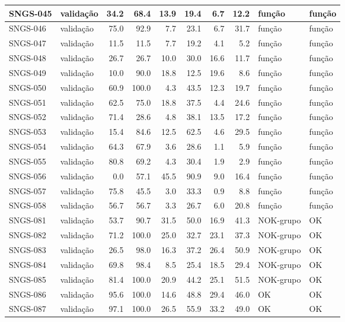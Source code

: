 \begin{small}
\begin{longtable}{|l|l|r|r|r|r|r|r|l|l|}
SNGS-045 & validação & 34.2 & 68.4 & 13.9 & 19.4 & 6.7 & 12.2 & função & função \\ \hline
SNGS-046 & validação & 75.0 & 92.9 & 7.7 & 23.1 & 6.7 & 31.7 & função & função \\ \hline
SNGS-047 & validação & 11.5 & 11.5 & 7.7 & 19.2 & 4.1 & 5.2 & função & função \\ \hline
SNGS-048 & validação & 26.7 & 26.7 & 10.0 & 30.0 & 16.6 & 11.7 & função & função \\ \hline
SNGS-049 & validação & 10.0 & 90.0 & 18.8 & 12.5 & 19.6 & 8.6 & função & função \\ \hline
SNGS-050 & validação & 60.9 & 100.0 & 4.3 & 43.5 & 12.3 & 19.7 & função & função \\ \hline
SNGS-051 & validação & 62.5 & 75.0 & 18.8 & 37.5 & 4.4 & 24.6 & função & função \\ \hline
SNGS-052 & validação & 71.4 & 28.6 & 4.8 & 38.1 & 13.5 & 17.2 & função & função \\ \hline
SNGS-053 & validação & 15.4 & 84.6 & 12.5 & 62.5 & 4.6 & 29.5 & função & função \\ \hline
SNGS-054 & validação & 64.3 & 67.9 & 3.6 & 28.6 & 1.1 & 5.9 & função & função \\ \hline
SNGS-055 & validação & 80.8 & 69.2 & 4.3 & 30.4 & 1.9 & 2.9 & função & função \\ \hline
SNGS-056 & validação & 0.0 & 57.1 & 45.5 & 90.9 & 9.0 & 16.4 & função & função \\ \hline
SNGS-057 & validação & 75.8 & 45.5 & 3.0 & 33.3 & 0.9 & 8.8 & função & função \\ \hline
SNGS-058 & validação & 56.7 & 56.7 & 3.3 & 26.7 & 6.0 & 20.8 & função & função \\ \hline
SNGS-081 & validação & 53.7 & 90.7 & 31.5 & 50.0 & 16.9 & 41.3 & NOK-grupo & OK \\ \hline
SNGS-082 & validação & 71.2 & 100.0 & 25.0 & 32.7 & 23.1 & 37.3 & NOK-grupo & OK \\ \hline
SNGS-083 & validação & 26.5 & 98.0 & 16.3 & 37.2 & 26.4 & 50.9 & NOK-grupo & OK \\ \hline
SNGS-084 & validação & 69.8 & 98.4 & 8.5 & 25.4 & 18.5 & 29.4 & NOK-grupo & OK \\ \hline
SNGS-085 & validação & 81.4 & 100.0 & 20.9 & 44.2 & 25.1 & 51.5 & NOK-grupo & OK \\ \hline
SNGS-086 & validação & 95.6 & 100.0 & 14.6 & 48.8 & 29.4 & 46.0 & OK & OK \\ \hline
SNGS-087 & validação & 97.1 & 100.0 & 26.5 & 55.9 & 33.2 & 49.0 & OK & OK \\ \hline

\end{longtable}
\end{small}

